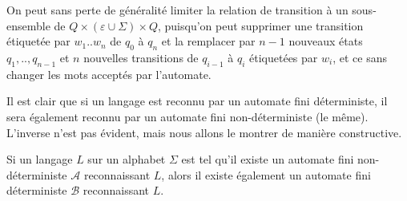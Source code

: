 \begin{rem}
On peut sans perte de généralité limiter la relation de transition à un sous-ensemble de $Q\times(\varepsilon\cup\Sigma)\times Q$, puisqu'on peut supprimer une transition étiquetée par $w_1..w_n$ de $q_0$ à $q_n$ et la remplacer par $n-1$ nouveaux états $q_1,..,q_{n-1}$ et $n$ nouvelles transitions de $q_{i-1}$ à $q_i$ étiquetées par $w_i$, et ce sans changer les mots acceptés par l'automate.
\end{rem}

Il est clair que si un langage est reconnu par un automate fini déterministe, il sera également reconnu par un automate fini non-déterministe (le même). L'inverse n'est pas évident, mais nous allons le montrer de manière constructive.

\begin{pro}
Si un langage $L$ sur un alphabet $\Sigma$ est tel qu'il existe un automate fini non-déterministe $\mathcal{A}$ reconnaissant $L$, alors il existe également un automate fini déterministe $\mathcal{B}$ reconnaissant $L$.
\end{pro}

